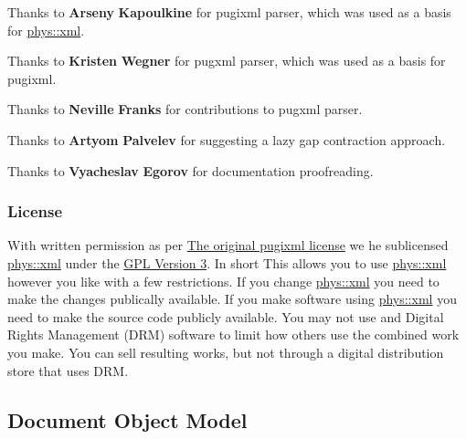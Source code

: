  Thanks to {\bfseries Arseny} {\bfseries Kapoulkine} for pugixml parser, which was used as a basis for \hyperlink{namespacephys_1_1xml}{phys::xml}. \par
 \par
 Thanks to {\bfseries Kristen} {\bfseries Wegner} for pugxml parser, which was used as a basis for pugixml. \par
 \par
 Thanks to {\bfseries Neville} {\bfseries Franks} for contributions to pugxml parser. \par
 \par
 Thanks to {\bfseries Artyom} {\bfseries Palvelev} for suggesting a lazy gap contraction approach. \par
 \par
 Thanks to {\bfseries Vyacheslav} {\bfseries Egorov} for documentation proofreading. \hypertarget{XMLManual_XMLLicense}{}\subsubsection{License}\label{XMLManual_XMLLicense}
With written permission as per \hyperlink{OriginalpugixmlLicense}{The original pugixml license} we he sublicensed \hyperlink{namespacephys_1_1xml}{phys::xml} under the \hyperlink{GPLLicense}{GPL Version 3}. In short This allows you to use \hyperlink{namespacephys_1_1xml}{phys::xml} however you like with a few restrictions. If you change \hyperlink{namespacephys_1_1xml}{phys::xml} you need to make the changes publically available. If you make software using \hyperlink{namespacephys_1_1xml}{phys::xml} you need to make the source code publicly available. You may not use and Digital Rights Management (DRM) software to limit how others use the combined work you make. You can sell resulting works, but not through a digital distribution store that uses DRM.\hypertarget{XMLManual_XMLDOM}{}\subsection{Document Object Model}\label{XMLManual_XMLDOM}

